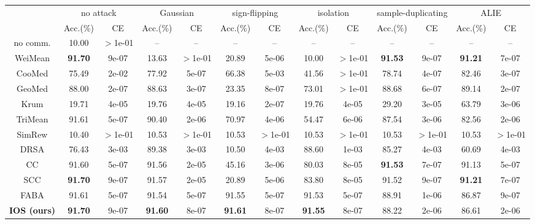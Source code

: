 \begin{tabular}{c|cc|cc|cc|cc|cc|cc}
\hline\hline
\multirow{2}{*}{}&\multicolumn{2}{c|}{no attack}&\multicolumn{2}{c|}{Gaussian}&\multicolumn{2}{c|}{sign-flipping}&\multicolumn{2}{c|}{isolation}&\multicolumn{2}{c|}{sample-duplicating}&\multicolumn{2}{c}{ALIE}\\
& Acc.(\%) & CE & Acc.(\%) & CE & Acc.(\%) & CE & Acc.(\%) & CE & Acc.(\%) & CE & Acc.(\%) & CE \\
\hline
no comm. & 10.00 & $>$1e-01 & -- & --  & -- & --  & -- & --  & -- & --  & -- & -- \\
\hline
WeiMean & \textbf{91.70} & {9e-07} & {13.63} & {$>$1e-01} & {20.89} & {5e-06} & {10.00} & {$>$1e-01} & \textbf{91.53} & {9e-07} & \textbf{91.21} & {7e-07}\\
CooMed & {75.49} & {2e-02} & {77.92} & {5e-07} & {66.38} & {5e-03} & {41.56} & {$>$1e-01} & {78.74} & {4e-07} & {82.46} & {3e-07}\\
GeoMed & {88.00} & {2e-07} & {88.63} & {3e-07} & {23.35} & {8e-07} & {73.01} & {$>$1e-01} & {88.68} & {6e-07} & {89.14} & {2e-07}\\
Krum & {19.71} & {4e-05} & {19.76} & {4e-05} & {19.16} & {2e-07} & {19.76} & {4e-05} & {29.20} & {3e-05} & {63.79} & {3e-06}\\
TriMean & {91.61} & {5e-07} & {90.40} & {2e-06} & {70.97} & {4e-06} & {54.47} & {6e-06} & {87.54} & {3e-06} & {82.56} & {2e-06}\\
SimRew & {10.40} & {$>$1e-01} & {10.53} & {$>$1e-01} & {10.53} & {$>$1e-01} & {10.53} & {$>$1e-01} & {10.53} & {$>$1e-01} & {10.53} & {$>$1e-01}\\
DRSA & {76.43} & {3e-03} & {89.38} & {3e-03} & {10.50} & {4e-03} & {88.60} & {1e-03} & {85.27} & {4e-03} & {60.69} & {4e-03}\\
CC & {91.60} & {5e-07} & {91.56} & {2e-05} & {45.16} & {3e-06} & {80.03} & {8e-05} & \textbf{91.53} & {7e-07} & {91.13} & {5e-07}\\
SCC & \textbf{91.70} & {9e-07} & {91.57} & {2e-05} & {20.89} & {5e-06} & {83.80} & {8e-05} & {91.52} & {9e-07} & \textbf{91.21} & {7e-07}\\
FABA & {91.61} & {5e-07} & {91.54} & {5e-07} & {91.55} & {5e-07} & {91.53} & {5e-07} & {88.91} & {1e-06} & {86.87} & {9e-07}\\
\textbf{IOS (ours)} & \textbf{91.70} & {9e-07} & \textbf{91.60} & {8e-07} & \textbf{91.61} & {8e-07} & \textbf{91.55} & {8e-07} & {88.22} & {2e-06} & {86.61} & {2e-06}\\
\hline\hline
\end{tabular}
